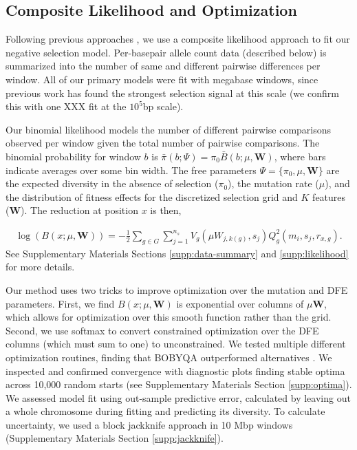 \documentclass[11pt]{article}
\begin{document}
\subsection*{Composite Likelihood and Optimization}
\label{sec:methods-likelihood}

Following previous approaches
\parencite{McVicker2009-ax,Elyashiv2016-vt,Murphy2022-sj}, we use a composite
likelihood approach to fit our negative selection model. Per-basepair allele
count data (described below) is summarized into the number of same and
different pairwise differences per window. All of our primary models were fit
with megabase windows, since previous work has found the strongest selection
signal at this scale (we confirm this with one XXX fit at the $10^5$bp scale).

Our binomial likelihood models the number of different pairwise comparisons
observed per window given the total number of pairwise comparisons. The
binomial probability for window $b$ is $\bar{\pi}(b; \Psi) = \pi_0 \bar{B}(b;
\mu, \mathbf{W})$, where bars indicate averages over some bin width. The free
parameters $\Psi = \{\pi_0, \mu, \mathbf{W}\}$ are the expected diversity in
the absence of selection ($\pi_0$), the mutation rate ($\mu$), and the
distribution of fitness effects for the discretized selection grid and $K$
features ($\mathbf{W}$). The reduction at position $x$ is then,

\begin{align}
    \log\left(B(x; \mu, \mathbf{W}) \right) = - \frac{1}{2} \sum_{g \in G} \sum_{j=1}^{n_s} V_g(\mu W_{j, k(g)}, s_j) Q_g^2(m_i, s_j, r_{x, g}).
\end{align}
%
See Supplementary Materials Sections \ref{supp:data-summary} and
\ref{supp:likelihood} for more details.

Our method uses two tricks to improve optimization over the mutation and DFE
parameters. First, we find $B(x; \mu, \mathbf{W})$ is exponential over columns
of $\mu \mathbf{W}$, which allows for optimization over this smooth function
rather than the grid. Second, we use softmax to convert constrained
optimization over the DFE columns (which must sum to one) to unconstrained. We
tested multiple different optimization routines, finding that BOBYQA
outperformed alternatives \parencite{Powell2009-jm,Johnson2007-tl}. We
inspected and confirmed convergence with diagnostic plots finding stable optima
across 10,000 random starts (see Supplementary Materials Section
\ref{supp:optima}). We assessed model fit using out-sample predictive error,
calculated by leaving out a whole chromosome during fitting and predicting its
diversity. To calculate uncertainty, we used a block jackknife approach in 10
Mbp windows (Supplementary Materials Section \ref{supp:jackknife}).
\end{document}

